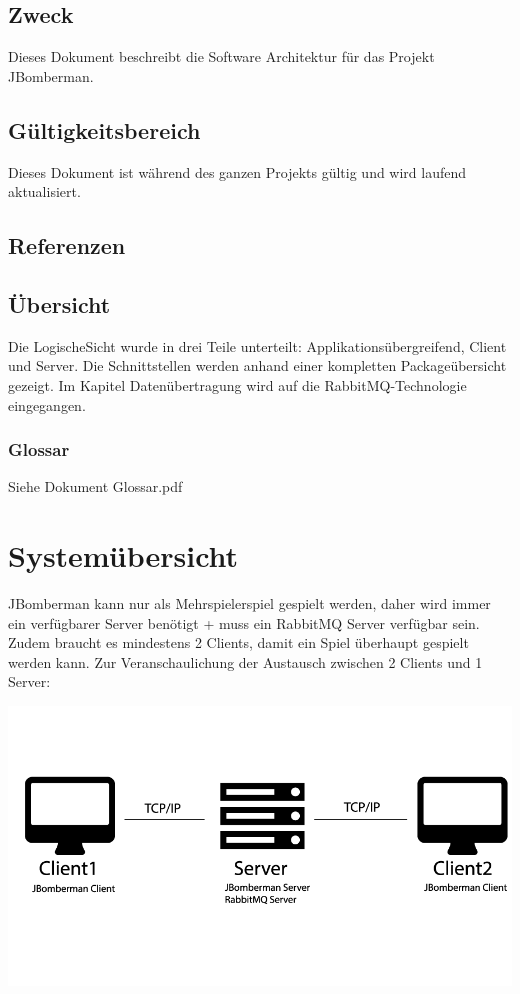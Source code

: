 \documentclass[11pt]{scrartcl}
\begin{document}
\subsection{Zweck}
Dieses Dokument beschreibt die Software Architektur für das Projekt JBomberman.
\subsection{Gültigkeitsbereich}
Dieses Dokument ist während des ganzen Projekts gültig und wird laufend aktualisiert.
\subsection{Referenzen}
\subsection{Übersicht}
Die LogischeSicht wurde in drei Teile unterteilt: Applikationsübergreifend, Client und Server. Die Schnittstellen werden anhand einer kompletten Packageübersicht gezeigt. Im Kapitel Datenübertragung wird auf die RabbitMQ-Technologie eingegangen. 
\subsubsection{Glossar}
Siehe Dokument Glossar.pdf
 
\section{Systemübersicht}
JBomberman kann nur als Mehrspielerspiel gespielt werden, daher wird immer ein verfügbarer Server benötigt + muss ein RabbitMQ Server verfügbar sein.
Zudem braucht es mindestens 2 Clients, damit ein Spiel überhaupt gespielt werden kann.
Zur Veranschaulichung der Austausch zwischen 2 Clients und 1 Server:

\includegraphics[scale=0.45]{systemuebersicht}
\newpage
\end{document}

